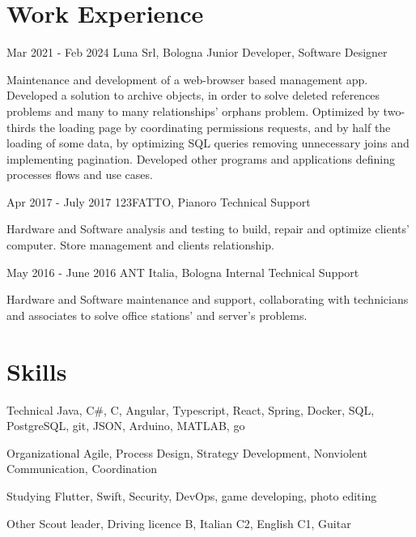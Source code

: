 \documentclass{tccv}
\begin{document}
\section{Work Experience}
\hfill
\begin{eventlist}

      \item{Mar 2021 - Feb 2024}
            {Luna Srl, Bologna}
            {Junior Developer, Software Designer}

      Maintenance and development of a web-browser based management app. Developed a solution to archive objects, in order to solve deleted references problems and many to many relationships' orphans problem.
      Optimized by two-thirds the loading page by coordinating permissions requests, and by half the loading of some data, by optimizing SQL queries removing unnecessary joins and implementing pagination.
      Developed other programs and applications defining processes flows and use cases.

      \item{Apr 2017 - July 2017}
            {123FATTO, Pianoro}
            {Technical Support}

      Hardware and Software analysis and testing to build, repair and optimize clients' computer. Store management and clients relationship.
      
      \item{May 2016 - June 2016}
            {ANT Italia, Bologna}
            {Internal Technical Support}

      Hardware and Software maintenance and support, collaborating with technicians and associates to solve office stations' and server's problems.
\end{eventlist}

\section{Skills}

\begin{factlist}
      \item{Technical}
            {Java, C\#, C, Angular, Typescript, React, Spring, Docker, SQL, PostgreSQL, git, JSON, Arduino, MATLAB, go}\\
      \item{Organizational}
            {Agile, Process Design, Strategy Development, Nonviolent Communication, Coordination}\\

      \item{Studying}
            {Flutter, Swift, Security, DevOps, game developing, photo editing}\\

      \item{Other}
            {Scout leader, Driving licence B, Italian C2, English C1, Guitar}\\
\end{factlist}
\end{document}
